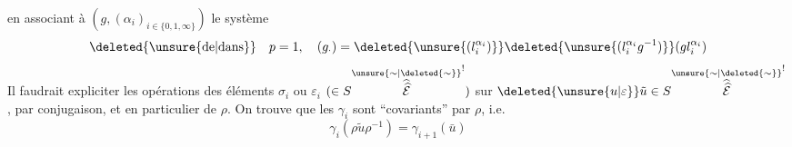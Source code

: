 en associant à $(g,(\alpha_i)_{i\in\{0,1,\infty\}})$ le système
\[
\deleted{\text{\unsure{de|dans}}}\quad p=1,\quad(g_\cdot)=\deleted{\unsure{(l_i^{\alpha_i})}}\deleted{\unsure{(l_i^{\alpha_i}g^{-1})}}(gl_i^{\alpha_i})
\]
Il faudrait expliciter les opérations des éléments $\sigma_i$ ou $\varepsilon_i$  $(\in S\overset{\unsure{\sim|\deleted{\sim}}}{\widehat{\widehat{\mathcal E}}}^{!})$ sur $\deleted{\unsure{u|\varepsilon}}\tilde u\in S\overset{\unsure{\sim|\deleted{\sim}}}{\widehat{\widehat{\mathcal E}}}^{!}$, par  conjugaison, et en particulier de $\rho$. On trouve que  les $\gamma_i$ sont ``covariants'' par $\rho$, i.e.
\[
\gamma_i(\rho\tilde u\rho^{-1})=\gamma_{i+1}(\bar u)
\]

